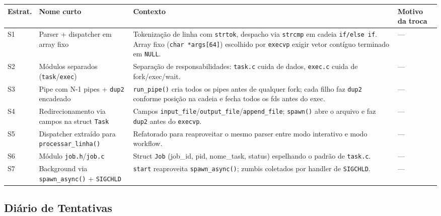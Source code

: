 \documentclass[11pt,a4paper]{article}
\begin{document}
\begin{longtable}{L{1.2cm} L{3.5cm} L{7.5cm} L{4.7cm}}
\toprule
\textbf{Estrat.} & \textbf{Nome curto} & \textbf{Contexto} & \textbf{Motivo da troca} \\
\midrule
\endhead
S1 & Parser + dispatcher em array fixo & Tokenização de linha com \texttt{strtok}, despacho via \texttt{strcmp} em cadeia \texttt{if/else if}. Array fixo (\texttt{char *args[64]}) escolhido por \texttt{execvp} exigir vetor contíguo terminado em \texttt{NULL}. & --- \\
S2 & Módulos separados (\texttt{task}/\texttt{exec}) & Separação de responsabilidades: \texttt{task.c} cuida de dados, \texttt{exec.c} cuida de fork/exec/wait. & --- \\
S3 & Pipe com N-1 pipes + \texttt{dup2} encadeado & \texttt{run\_pipe()} cria todos os pipes antes de qualquer fork; cada filho faz \texttt{dup2} conforme posição na cadeia e fecha todos os fds antes do exec. & --- \\
S4 & Redirecionamento via campos na struct \texttt{Task} & Campos \texttt{input\_file}/\texttt{output\_file}/\texttt{append\_file}; \texttt{spawn()} abre o arquivo e faz \texttt{dup2} antes do \texttt{execvp}. & --- \\
S5 & Dispatcher extraído para \texttt{processar\_linha()} & Refatorado para reaproveitar o mesmo parser entre modo interativo e modo workflow. & --- \\
S6 & Módulo \texttt{job.h}/\texttt{job.c} & Struct \texttt{Job} (job\_id, pid, nome\_task, status) espelhando o padrão de \texttt{task.c}. & --- \\
S7 & Background via \texttt{spawn\_async()} + \texttt{SIGCHLD} & \texttt{start} reaproveita \texttt{spawn\_async()}; zumbis coletados por handler de \texttt{SIGCHLD}. & --- \\
\bottomrule
\end{longtable}

\subsection{Diário de Tentativas}
\end{document}

